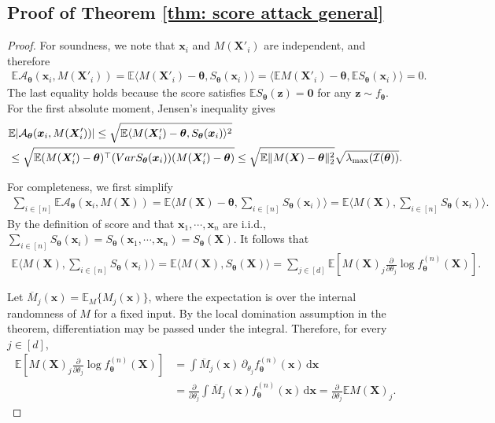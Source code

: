 \documentclass[letterpaper,12pt]{article}
\renewcommand{\d}{\mathrm{d}}
\numberwithin{equation}{section}
\theoremstyle{plain}
\numberwithin{Theorem}{section}
\numberwithin{proposition}{section}
\numberwithin{Lemma}{section}
{
	\theoremstyle{definition}
	\newtheorem{Definition}{Definition}
	\newtheorem{example}{Example}
	\numberwithin{example}{section}
	\newtheorem{fact}{Fact}
	\numberwithin{fact}{section}
	\newtheorem{remark}{Remark}
}
\newcommand{\A}{\mathcal{A}}
\newcommand{\1}{\mathbbm{1}}
\def\bth{{\boldsymbol{\theta}}}
\def\Var{{\rm Var}}
\def\E{\mathbb{E}}
\begin{document}
\subsection{Proof of Theorem \ref{thm: score attack general}}\label{sec: proof of thm: score attack general}
\begin{proof}
	For soundness, we note that $\bm x_i$ and $M(\bm X'_i)$ are independent, and therefore
	\begin{align*}
			\E \mathcal A_\bth(\bm x_i, M(\bm X'_i)) = \E \langle M(\bm X'_i) - \bth, S_\bth(\bm x_i)\rangle = \langle \E M(\bm X'_i) - \bth,  \E S_\bth(\bm x_i)\rangle  = 0.
	\end{align*}
	The last equality holds because the score satisfies $\E S_\bth(\bm z) = \bm 0$ for any $\bm z \sim f_\bth$. For the first absolute moment, Jensen's inequality gives
	\begin{align*}
		&\E |\mathcal A_\bth(\bm x_i, M(\bm X'_i))| \leq \sqrt{\E \langle M(\bm X'_i) - \bth, S_\bth(\bm x_i)\rangle^2}  \\
		&\leq \sqrt{\E (M(\bm X'_i) - \bth)^\top (\Var S_\bth(\bm x_i))(M(\bm X'_i) - \bth)} \leq \sqrt{\E\|M(\bm X) - \bth\|^2_2} \sqrt{\lambda_{\max}(\mathcal I(\bth))}.
	\end{align*}
	
	For completeness, we first simplify
	\begin{align*}
		\sum_{i \in [n]} \E \A_\bth (\bm x_i, M(\bm X))
		= \E \Big\langle M(\bm X) - \bth, \sum_{i \in [n]} S_\bth(\bm x_i)\Big\rangle = \E \Big\langle M(\bm X), \sum_{i \in [n]} S_\bth(\bm x_i)\Big\rangle.
	\end{align*}
	By the definition of score and that $\bm x_1, \cdots, \bm x_n$ are i.i.d., $\sum_{i \in [n]} S_\bth(\bm x_i) = S_\bth(\bm x_1,\cdots, \bm x_n) = S_\bth(\bm X)$. It follows that
	\begin{align*}
		\E \Big\langle M(\bm X), \sum_{i \in [n]} S_\bth(\bm x_i)\Big\rangle = \E \Big\langle M(\bm X), S_\bth(\bm X)\Big\rangle = \sum_{j \in [d]} \E \left[M(\bm X)_j \frac{\partial}{\partial \theta_j} \log f_\bth^{(n)}(\bm X) \right].
	\end{align*}
	
		Let $\overline M_j(\bm x)=\E_M\{M_j(\bm x)\}$, where the expectation is over the internal randomness of $M$ for a fixed input. By the local domination assumption in the theorem, differentiation may be passed under the integral. Therefore, for every $j\in[d]$,
		\begin{align*}
			\E \left[M(\bm X)_j \frac{\partial}{\partial \theta_j} \log f_\bth^{(n)}(\bm X) \right]
			&=\int \overline M_j(\bm x)\,\partial_{\theta_j}f_\bth^{(n)}(\bm x)\,\d\bm x\\
			&=\frac{\partial}{\partial\theta_j}\int \overline M_j(\bm x)f_\bth^{(n)}(\bm x)\,\d\bm x
			= \frac{\partial}{\partial \theta_j}\E M(\bm X)_j.
		\end{align*}
\end{proof}
\end{document}
